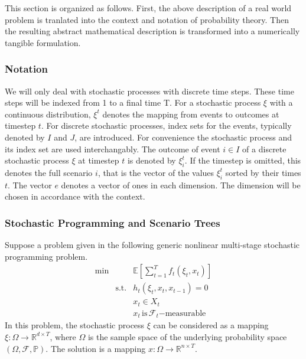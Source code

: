 \documentclass[a4paper, 12pt] {article}
\begin{document}
This section is organized as follows. First, the above description of a real world problem is tranlated into the context and notation of probability theory. Then the resulting abstract mathematical description is transformed into a numerically tangible formulation.
\subsubsection{Notation}
We will only deal with stochastic processes with discrete time steps. These time steps will be indexed from 1 to a final time T. For a stochastic process $\xi$ with a continuous distribution, $\xi^t$ denotes the mapping from events to outcomes at timestep $t$. For discrete stochastic processes, index sets for the events, typically denoted by $I$ and $J$, are introduced. For convenience the stochastic process and its index set are used interchangably. The outcome of event $i\in I$ of a discrete stochastic process $\xi$ at timestep $t$ is denoted by $\xi_i^t$. If the timestep is omitted, this denotes the full scenario $i$, that is the vector of the values $\xi_i^t$ sorted by their times $t$.
The vector $e$ denotes a vector of ones in each dimension. The dimension will be chosen in accordance with the context. 
\subsubsection{Stochastic Programming and Scenario Trees}
Suppose a problem given in the following generic nonlinear multi-stage stochastic programming problem. 
\begin{eqnarray}
  \label{eq:genericSP}
  \min &&\mathbb{E}\left[\sum_{t=1}^Tf_t(\xi_t, x_t)\right]\\
  &\mathrm{s.t.}& h_t(\xi_t, x_t, x_{t-1}) = 0\\
  &&x_t \in X_t\\
  &&x_t \, \mathrm{is}\,\mathcal{F}_t \mathrm{-measurable} \label{eqn:measurability-constraint}
\end{eqnarray}
In this problem, the stochastic process $\xi$ can be considered as a mapping $\xi:\Omega\rightarrow \mathbb{R}^{d\times T}$, where $\Omega$ is the sample space of the underlying probability space $(\Omega, \mathcal{F}, \mathbb{P})$. The solution is a mapping $x:\Omega\rightarrow \mathbb{R}^{n\times T}$.
 
\end{document}
